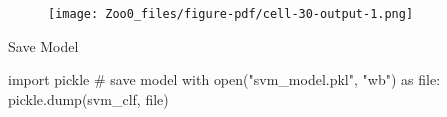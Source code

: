 \documentclass[
  letterpaper,
]{krantz}
\makeatletter
\newenvironment{Shaded}{\begin{snugshade}}{\end{snugshade}}
\newcommand{\BuiltInTok}[1]{\textcolor[rgb]{0.00,0.23,0.31}{#1}}
\newcommand{\CommentTok}[1]{\textcolor[rgb]{0.37,0.37,0.37}{#1}}
\newcommand{\ControlFlowTok}[1]{\textcolor[rgb]{0.00,0.23,0.31}{#1}}
\newcommand{\ImportTok}[1]{\textcolor[rgb]{0.00,0.46,0.62}{#1}}
\newcommand{\NormalTok}[1]{\textcolor[rgb]{0.00,0.23,0.31}{#1}}
\newcommand{\StringTok}[1]{\textcolor[rgb]{0.13,0.47,0.30}{#1}}
\newenvironment{kframe}{%
\medskip{}
\setlength{\fboxsep}{.8em}
 \def\at@end@of@kframe{}%
 \ifinner\ifhmode%
  \def\at@end@of@kframe{\end{minipage}}%
  \begin{minipage}{\columnwidth}%
 \fi\fi%
 \def\FrameCommand##1{\hskip\@totalleftmargin \hskip-\fboxsep
 \colorbox{shadecolor}{##1}\hskip-\fboxsep
     \hskip-\linewidth \hskip-\@totalleftmargin \hskip\columnwidth}%
 \MakeFramed {\advance\hsize-\width
   \@totalleftmargin\z@ \linewidth\hsize
   \@setminipage}}%
 {\par\unskip\endMakeFramed%
 \at@end@of@kframe}
\renewenvironment{Shaded}{\begin{kframe}}{\end{kframe}}
\makeatother
\begin{document}
\begin{figure}[H]

{\centering \texttt{[image: Zoo0\_files/figure-pdf/cell-30-output-1.png]}

}

\end{figure}

Save Model

\begin{Shaded}
\begin{Highlighting}[]
\ImportTok{import}\NormalTok{ pickle}
\CommentTok{\# save model}
\ControlFlowTok{with} \BuiltInTok{open}\NormalTok{(}\StringTok{"svm\_model.pkl"}\NormalTok{, }\StringTok{"wb"}\NormalTok{) }\ImportTok{as} \BuiltInTok{file}\NormalTok{:}
\NormalTok{    pickle.dump(svm\_clf, }\BuiltInTok{file}\NormalTok{)}
\end{Highlighting}
\end{Shaded}




\backmatter
\printindex
\end{document}

